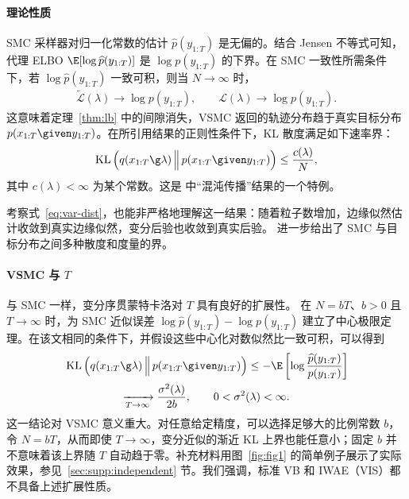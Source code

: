 \paragraph{理论性质}
SMC 采样器对归一化常数的估计 $\widehat p(y_{1:T})$ 是无偏的\citep{DelMoral2004,Pitt2012,Naesseth2014}。结合 Jensen 不等式可知，代理 ELBO $\E[\log\widehat p(y_{1:T})]$ 是 $\log p(y_{1:T})$ 的下界。在 SMC 一致性所需条件下，若 $\log\widehat p(y_{1:T})$ 一致可积，则当 $N\to\infty$ 时\citep{DelMoral2004}，
\begin{align*}
\widetilde{\mathcal L}(\lambda)\longrightarrow\log p(y_{1:T}),\qquad
\mathcal L(\lambda)\longrightarrow\log p(y_{1:T}).
\end{align*}
这意味着定理~\ref{thm:lb} 中的间隙消失，VSMC 返回的轨迹分布趋于真实目标分布 $p(x_{1:T}\given y_{1:T})$。在所引用结果的正则性条件下，KL 散度满足如下速率界：
\begin{align*}
\operatorname{KL}\left(q(x_{1:T}\g\lambda)\,\Big\|\,p(x_{1:T}\given y_{1:T})\right)\leq\frac{c(\lambda)}N,
\end{align*}
其中 $c(\lambda)<\infty$ 为某个常数。这是 \citet[定理 8.3.2]{DelMoral2004} 中“混沌传播”结果的一个特例。

考察式~\eqref{eq:var-dist}，也能非严格地理解这一结果：随着粒子数增加，边缘似然估计收敛到真实边缘似然，变分后验也收敛到真实后验。\citet{Huggins2017} 进一步给出了 SMC 与目标分布之间多种散度和度量的界。

\paragraph{VSMC 与 $T$}
与 SMC 一样，变分序贯蒙特卡洛对 $T$ 具有良好的扩展性。\citet{berard2014} 在 $N=bT$、$b>0$ 且 $T\to\infty$ 时，为 SMC 近似误差 $\log\widehat p(y_{1:T})-\log p(y_{1:T})$ 建立了中心极限定理。在该文相同的条件下，并假设这些中心化对数似然比一致可积，可以得到
\begin{align*}
&\operatorname{KL}\left(q(x_{1:T}\g\lambda)\,\Big\|\,p(x_{1:T}\given y_{1:T})\right)
\leq-\E\left[\log\frac{\widehat p(y_{1:T})}{p(y_{1:T})}\right]\\
&\hspace{5em}\xrightarrow[T\to\infty]{}\frac{\sigma^2(\lambda)}{2b},\qquad0<\sigma^2(\lambda)<\infty.
\end{align*}
这一结论对 VSMC 意义重大。对任意给定精度，可以选择足够大的比例常数 $b$，令 $N=bT$，从而即使 $T\to\infty$，变分近似的渐近 KL 上界也能任意小；固定 $b$ 并不意味着该上界随 $T$ 自动趋于零。补充材料用图~\ref{fig:fig1} 的简单例子展示了实际效果，参见~\ref{sec:supp:independent} 节。我们强调，标准 VB 和 IWAE（VIS）都不具备上述扩展性质。
